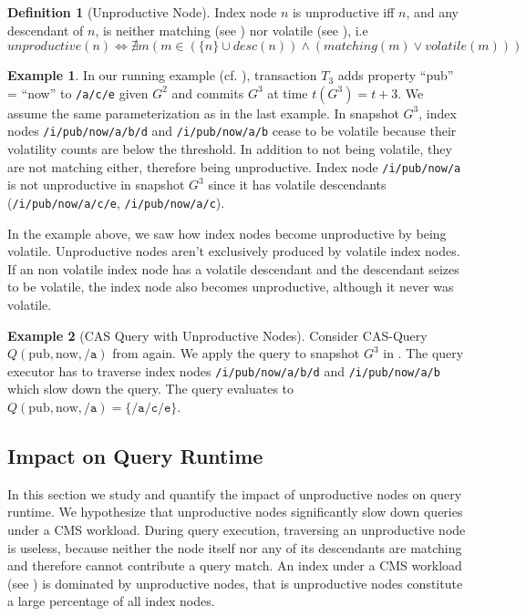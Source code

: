 \documentclass[abstracton,12pt]{scrartcl}
\theoremstyle{definition}
\newtheorem{definition}{Definition}
\newtheorem{example}{Example}
\begin{document}
\begin{definition}[Unproductive Node]
  Index node $n$ is unproductive iff $n$, and any descendant of
  $n$, is neither matching (see ) nor volatile (see
  ), i.e
  $$ unproductive(n) \iff \nexists m (m \in (\{n\} \cup desc(n)) \land
  (matching(m) \lor volatile(m)))$$
\end{definition}

\begin{example}
  In our running example (cf. ), transaction $T_3$ adds
  property ``pub'' = ``now'' to \texttt{/a/c/e} given $G^2$ and commits $G^3$ at time
  $t(G^3) = t+3$. We assume the same parameterization as in the last example.
  In snapshot $G^3$, index nodes \texttt{/i/pub/now/a/b/d} and
  \texttt{/i/pub/now/a/b} cease to be volatile because their 
  volatility counts are below the threshold. In addition to not being volatile,
  they are not matching either, therefore being unproductive. Index node
  \texttt{/i/pub/now/a} is not unproductive in snapshot $G^3$ since it has
  volatile descendants (\texttt{/i/pub/now/a/c/e}, \texttt{/i/pub/now/a/c}). 
\end{example}

In the example above, we saw how index nodes become unproductive by being
volatile. Unproductive nodes aren't exclusively produced by volatile index
nodes. If an non volatile index node has a volatile descendant and the descendant seizes to
be volatile, the index node also becomes unproductive, although it never was
volatile.

\begin{example}[CAS Query with Unproductive Nodes]
  Consider CAS-Query $Q(\text{pub},\text{now},\texttt{/a})$ from
   again. We apply the query to snapshot $G^3$ in
  . The query executor has to traverse index nodes
  \texttt{/i/pub/now/a/b/d} and \texttt{/i/pub/now/a/b} which slow down the
  query. The query evaluates to
  $Q(\text{pub},\text{now},\texttt{/a}) = \{\texttt{/a/c/e}\}$.
\end{example}

\subsection{Impact on Query Runtime}

In this section we study and quantify the impact of unproductive nodes on
query runtime. We hypothesize that unproductive nodes
significantly slow down queries under a CMS workload. During query
execution, traversing an unproductive node is
useless, because neither the node itself nor any of its descendants are matching
and therefore cannot contribute a query match.
An index under a CMS workload (see ) is dominated
by unproductive nodes, that is unproductive nodes constitute a large percentage
of all index nodes.
\end{document}
